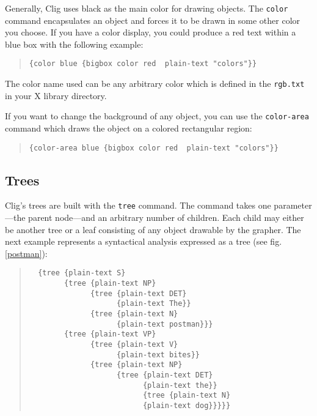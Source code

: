 Generally, {\sc Clig} uses black as the main color for drawing objects.
The {\tt color} command encapsulates an object and forces it to be
drawn in some other color you choose. If you have a color display, you
could produce a red text within a blue box with the following example:
 
\begin{quote}
\verb'{color blue {bigbox color red  plain-text "colors"}}' \newline
\end{quote}   

The color name used can be any arbitrary color which is defined in 
the {\tt rgb.txt} in your X library directory.

If you want to change the background of any object, you can use
the {\tt color-area} command which draws the object on a colored
rectangular region:

\begin{quote}
\verb'{color-area blue {bigbox color red  plain-text "colors"}}' \newline
\end{quote}

\subsection{Trees}

{\sc Clig}'s trees are built with the {\tt tree} command. The command
takes one parameter---the parent node---and an arbitrary number of
children. Each child may either be another tree or a leaf consisting of
any object drawable by the grapher. The next example represents a
syntactical analysis expressed as a tree (see fig. \ref{postman}):



\begin{quote}
\begin{verbatim}
  {tree {plain-text S} 
        {tree {plain-text NP} 
              {tree {plain-text DET}
                    {plain-text The}} 
              {tree {plain-text N} 
                    {plain-text postman}}} 
        {tree {plain-text VP} 
              {tree {plain-text V} 
                    {plain-text bites}} 
              {tree {plain-text NP} 
                    {tree {plain-text DET} 
                          {plain-text the}} 
                          {tree {plain-text N} 
                          {plain-text dog}}}}}
\end{verbatim}
\end{quote}

